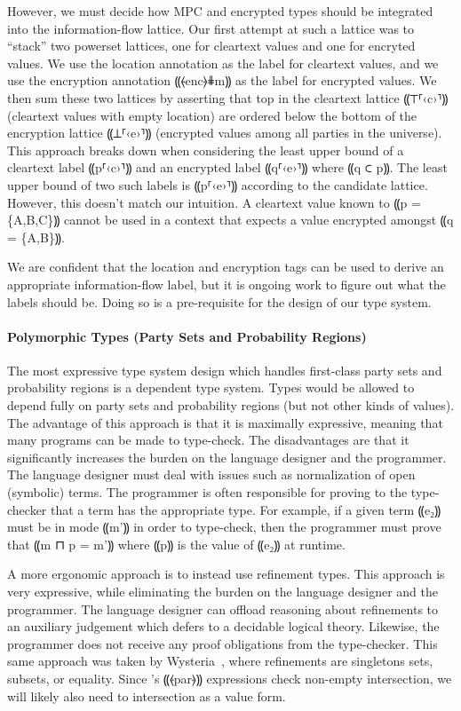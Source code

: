 However, we must decide how MPC and encrypted types should be integrated into
the information-flow lattice. Our first attempt at such a lattice was to ``stack''
two powerset lattices, one for cleartext values and one for encryted values. We
use the location annotation as the label for cleartext values, and we use the
encryption annotation ⸨⦑enc⦒⋕m⸩ as the label for encrypted values. We then
sum these two lattices by asserting that top in the cleartext lattice ⸨⊤⸢‹c›⸣⸩
(cleartext values with empty location) are ordered below the bottom of the
encryption lattice ⸨⊥⸢‹e›⸣⸩ (encrypted values among all parties in the universe).
This approach breaks down when considering the least upper bound of a cleartext
label ⸨p⸢‹c›⸣⸩ and an encrypted label ⸨q⸢‹e›⸣⸩ where ⸨q ⊂ p⸩. The least upper
bound of two such labels is ⸨p⸢‹e›⸣⸩ according to the candidate lattice. However,
this doesn't match our intuition. A cleartext value known to ⸨p = \{A,B,C\}⸩ cannot
be used in a context that expects a value encrypted amongst ⸨q = \{A,B\}⸩.

We are confident that the location and encryption tags can be used to derive an appropriate
information-flow label, but it is ongoing work to figure out what the labels should be. Doing
so is a pre-requisite for the design of our type system.

\paragraph*{Polymorphic Types (Party Sets and Probability Regions)}

The most expressive type system design which handles first-class party sets
and probability regions is a dependent type system. Types would be allowed to
depend fully on party sets and probability regions (but not other kinds of values).
The advantage of this approach is that it is maximally expressive, meaning that
many programs can be made to type-check. The disadvantages are that it significantly
increases the burden on the language designer and the programmer. The language designer
must deal with issues such as normalization of open (symbolic) terms. The programmer
is often responsible for proving to the type-checker that a term has the appropriate type.
For example, if a given term ⸨e₂⸩ must be in mode ⸨m'⸩ in order to type-check, then the
programmer must prove that ⸨m ⊓ p = m'⸩ where ⸨p⸩ is the value of ⸨e₂⸩ at runtime.

A more ergonomic approach is to instead use refinement types. This approach is very expressive,
while eliminating the burden on the language designer and the programmer. The language
designer can offload reasoning about refinements to an auxiliary judgement which defers to
a decidable logical theory. Likewise, the programmer does not receive any proof obligations from
the type-checker. This same approach was taken by Wysteria~\cite{rastogi14wysteria},
where refinements are singletons sets, subsets, or equality. Since \lang's ⸨⦑par⦒⸩ expressions
check non-empty intersection, we will likely also need to intersection as a value form.

